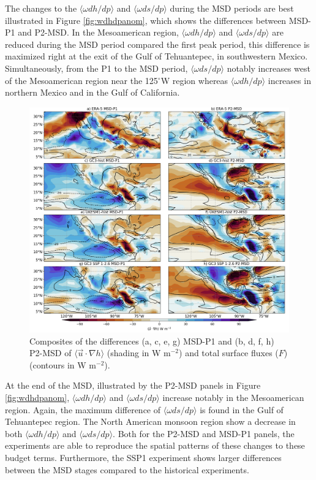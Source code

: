  The changes to the $\langle \omega dh/dp \rangle$ and $\langle \omega ds/dp \rangle$ during the MSD periods are best illustrated in Figure \ref{fig:wdhdpanom}, which shows the differences between MSD-P1 and P2-MSD. In the Mesoamerican region, $\langle \omega dh/dp \rangle$ and $\langle \omega ds/dp \rangle$ are reduced during the MSD period compared the first peak period, this difference is maximized right at the exit of the Gulf of Tehuantepec, in southwestern Mexico. 
 Simultaneously, from the P1 to the MSD period, $\langle \omega ds/dp \rangle$ notably increases west of the Mesoamerican region near the 125$^\circ$W region whereas $\langle \omega dh/dp \rangle$ increases in northern Mexico and in the Gulf of California. 
 
\begin{figure}[t!]
\includegraphics[width=\linewidth]{figures/thermocompositeint_udothanom.png}
\caption[Composites of the anomalous horizontal advection of MSE and surface fluxes]{Composites of the differences (a, c, e, g) MSD-P1 and (b, d, f, h) P2-MSD of $\langle \vec{u}\cdot\nabla h \rangle$ (shading in W m$^{-2}$) and total surface fluxes ($F$) (contours in W m$^{-2}$).  }
\label{fig:intudothanom}
\end{figure} 
  
 
 At the end of the MSD, illustrated by the P2-MSD panels in Figure \ref{fig:wdhdpanom}, $\langle \omega dh/dp \rangle$ and $\langle \omega ds/dp \rangle$ increase notably in the Mesoamerican region. Again, the maximum difference of $\langle \omega ds/dp \rangle$ is found in the Gulf of Tehuantepec region. The North American monsoon region show a decrease in both $\langle \omega dh/dp \rangle$ and $\langle \omega ds/dp \rangle$. 
 Both for the P2-MSD and MSD-P1 panels, the experiments are able to reproduce the spatial patterns of these changes to these budget terms. Furthermore, the SSP1 experiment shows larger differences between the MSD stages compared to the historical experiments.


